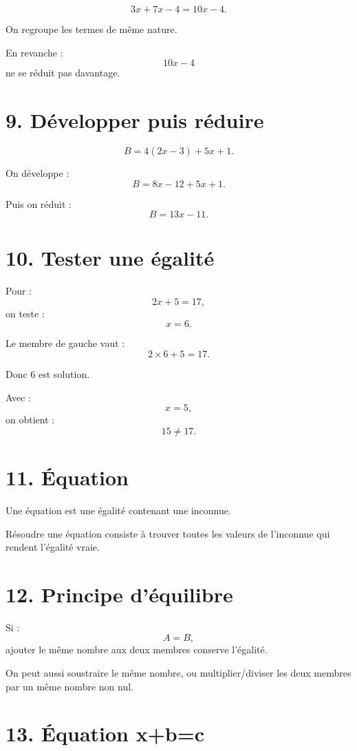 \[
3x+7x-4=10x-4.
\]

On regroupe les termes de même nature.

En revanche :
\[
10x-4
\]
ne se réduit pas davantage.

\section{9. Développer puis réduire}

\[
B=4(2x-3)+5x+1.
\]

On développe :
\[
B=8x-12+5x+1.
\]

Puis on réduit :
\[
\boxed{B=13x-11}.
\]

\section{10. Tester une égalité}

Pour :
\[
2x+5=17,
\]
on teste :
\[
x=6.
\]

Le membre de gauche vaut :
\[
2\times6+5=17.
\]

Donc $6$ est solution.

Avec :
\[
x=5,
\]
on obtient :
\[
15\neq17.
\]

\section{11. Équation}

\begin{definition}
Une équation est une égalité contenant une inconnue.

Résoudre une équation consiste à trouver toutes les valeurs de l'inconnue qui rendent l'égalité vraie.
\end{definition}

\section{12. Principe d'équilibre}


Si :
\[
A=B,
\]
ajouter le même nombre aux deux membres conserve l'égalité.

On peut aussi soustraire le même nombre, ou multiplier/diviser les deux membres par un même nombre non nul.

\section{13. Équation x+b=c}


